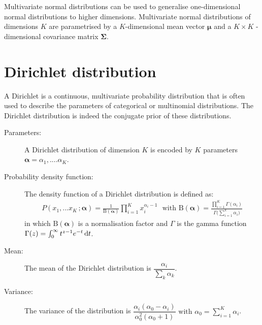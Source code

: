 Multivariate normal distributions can be used to generalise one-dimensional normal distributions to higher dimensions. Multivariate normal distributions of dimensions $K$ are parametrised by a $K$-dimensional mean vector $\boldsymbol\mu$ and a $K \times K$ - dimensional covariance matrix $\boldsymbol\Sigma$. 

\section*{Dirichlet distribution}

A Dirichlet is a continuous, multivariate probability distribution that is often used to describe the parameters of categorical or multinomial distributions.  The Dirichlet distribution is indeed the conjugate prior of these distributions. 

\begin{description}
\item [Parameters: ] A Dirichlet distribution of dimension $K$ is encoded by $K$ parameters $\boldsymbol\alpha = \alpha_1, .... \alpha_K$. 

\item [Probability density function: ] The density function of a Dirichlet distribution is defined as:
\begin{align}
P(x_1,...x_K\,; \boldsymbol\alpha) = \frac{1}{\mathrm{B}(\boldsymbol\alpha)} \prod_{i=1}^K x_i^{\alpha_i - 1} \ \ \ \text{with } \mathrm{B}(\boldsymbol\alpha) = \frac{\prod_{i=1}^K \Gamma(\alpha_i)}{\Gamma\bigl(\sum_{i=1}^k \alpha_i\bigr)}
\end{align}
in which $ \mathrm{B}(\boldsymbol\alpha)$ is a normalisation factor and $\Gamma$ is the gamma function $\Gamma(z) = \int_0^\infty  t^{z-1} e^{-t}\,{\rm d}t$. 

\item [Mean: ] The mean of the Dirichlet distribution is $\dfrac{\alpha_i}{\sum_k \alpha_k}$.

\item [Variance: ] The variance of the distribution is $\dfrac{\alpha_i (\alpha_0-\alpha_i)}{\alpha_0^2 (\alpha_0+1)} \text{ with } \alpha_0 = \sum_{i=1}^K\alpha_i$.

\end{description}


